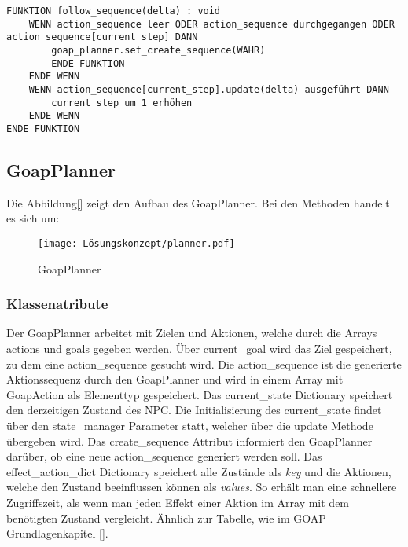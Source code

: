 \begin{lstlisting}[language=Pseudo, caption={follow\_sequence Methode des GoapAgent}, mathescape=true]
FUNKTION follow_sequence(delta) : void
	WENN action_sequence leer ODER action_sequence durchgegangen ODER action_sequence[current_step] DANN
		goap_planner.set_create_sequence(WAHR)
		ENDE FUNKTION
	ENDE WENN
	WENN action_sequence[current_step].update(delta) ausgeführt DANN
		current_step um 1 erhöhen
	ENDE WENN
ENDE FUNKTION
\end{lstlisting}




\subsection{GoapPlanner}
\label{chap:goapplanner uml}

Die Abbildung\ref{} zeigt den Aufbau des GoapPlanner. Bei den Methoden handelt es sich um: 

\begin{figure}[h]
  \centering
  \texttt{[image: Lösungskonzept/planner.pdf]}
	\captionsetup{justification=justified, format=plain}
  \caption{GoapPlanner}
  \label{fig:GoapPlanner}
\end{figure}

\subsubsection{Klassenatribute}
\label{chap:goapplanner klassenattribute}

Der GoapPlanner arbeitet mit Zielen und Aktionen, welche durch die Arrays actions und goals gegeben werden. \"{U}ber current\_goal wird das Ziel gespeichert, zu dem eine action\_sequence gesucht wird. Die action\_sequence ist die generierte Aktionssequenz durch den GoapPlanner und wird in einem Array mit GoapAction als Elementtyp gespeichert. Das current\_state Dictionary speichert den derzeitigen Zustand des NPC. Die Initialisierung des current\_state findet über den state\_manager Parameter statt, welcher über die update Methode übergeben wird. Das create\_sequence Attribut informiert den GoapPlanner darüber, ob eine neue action\_sequence generiert werden soll. Das effect\_action\_dict Dictionary speichert alle Zustände als \textit{key} und die Aktionen, welche den Zustand beeinflussen können als \textit{values}. So erhält man eine schnellere Zugriffszeit, als wenn man jeden Effekt einer Aktion im Array mit dem benötigten Zustand vergleicht. \"{A}hnlich zur Tabelle, wie im GOAP Grundlagenkapitel \ref{}.

